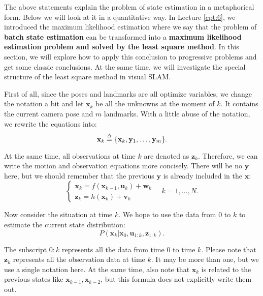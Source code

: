 The above statements explain the problem of state estimation in a metaphorical form. Below we will look at it in a quantitative way. In Lecture \ref{cpt:6}, we introduced the maximum likelihood estimation where we say that the problem of \textbf{batch state estimation} can be transformed into a \textbf{maximum likelihood estimation problem and solved by the least square method}. In this section, we will explore how to apply this conclusion to progressive problems and get some classic conclusions. At the same time, we will investigate the special structure of the least square method in visual SLAM.

First of all, since the poses and landmarks are all optimize variables, we change the notation a bit and let $\mathbf{x}_k$ be all the unknowns at the moment of $k$. It contains the current camera pose and $m$ landmarks. With a little abuse of the notation, we rewrite the equations into:
\begin{equation}
	\mathbf{x}_k  \buildrel \Delta \over =  \{ \mathbf{x}_k, \mathbf{y}_1, \ldots, \mathbf{y}_m \}.
\end{equation}

At the same time, all observations at time $k$ are denoted as $\mathbf{z}_k$. Therefore, we can write the motion and observation equations more concisely. There will be no $\mathbf{y}$ here, but we should remember that the previous $\mathbf{y}$ is already included in the $\mathbf{x}$:
\begin{equation}
	\left\{ \begin{array}{l}
		{\mathbf{x}_k} = f\left( {{\mathbf{x}_{k - 1}},{\mathbf{u}_k}} \right) + \mathbf{w}_k \\
		{\mathbf{z}_{k}} = h\left( \mathbf{x}_k  \right)+ \mathbf{v}_{k}
	\end{array} \right. \quad k=1, \ldots, N .
\end{equation}

Now consider the situation at time $k$. We hope to use the data from $0$ to $k$ to estimate the current state distribution:
\begin{equation}
	P(\mathbf{x}_k | \mathbf{x}_0, \mathbf{u}_{1:k}, \mathbf{z}_{1:k}).
\end{equation}

The subscript $0:k$ represents all the data from time $0$ to time $k$. Please note that $\mathbf{z}_k$ represents all the observation data at time $k$. It may be more than one, but we use a single notation here. At the same time, also note that $\mathbf{x}_k$ is related to the previous states like $\mathbf{x}_{k-1}, \mathbf{x}_{k-2}$, but this formula does not explicitly write them out.


